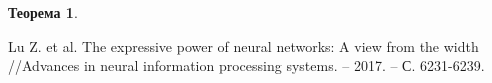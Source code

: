 \documentclass[12pt, twoside]{article}
\theoremstyle{definition}
\newtheorem*{theorem*}{Теорема}
\begin{document}
\begin{theorem*}
\end{theorem*}

\begin{thebibliography}{4}
 Lu Z. et al. The expressive power of neural networks: A view from the width //Advances in neural information processing systems. – 2017. – С. 6231-6239.
\end{thebibliography}
\end{document}
